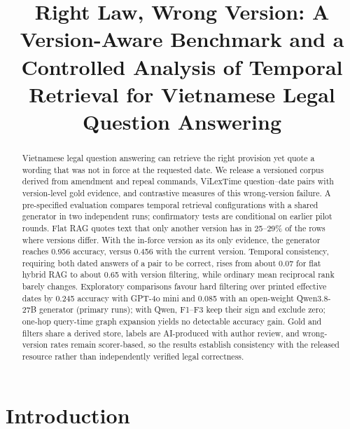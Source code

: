 \documentclass[sigconf,anonymous,review]{acmart}
\begin{document}
\title{Right Law, Wrong Version: A Version-Aware Benchmark and a Controlled Analysis of Temporal Retrieval for Vietnamese Legal Question Answering}



\begin{abstract}
Vietnamese legal question answering can retrieve the right provision yet quote a wording that was not in force at the requested date. We release a versioned corpus derived from amendment and repeal commands, ViLexTime question--date pairs with version-level gold evidence, and contrastive measures of this wrong-version failure. A pre-specified evaluation compares temporal retrieval configurations with a shared generator in two independent runs; confirmatory tests are conditional on earlier pilot rounds. Flat RAG quotes text that only another version has in 25--29\% of the rows where versions differ. With the in-force version as its only evidence, the generator reaches 0.956 accuracy, versus 0.456 with the current version. Temporal consistency, requiring both dated answers of a pair to be correct, rises from about 0.07 for flat hybrid RAG to about 0.65 with version filtering, while ordinary mean reciprocal rank barely changes. Exploratory comparisons favour hard filtering over printed effective dates by 0.245 accuracy with GPT-4o mini and 0.085 with an open-weight Qwen3.8-27B generator (primary runs); with Qwen, F1--F3 keep their sign and exclude zero; one-hop query-time graph expansion yields no detectable accuracy gain. Gold and filters share a derived store, labels are AI-produced with author review, and wrong-version rates remain scorer-based, so the results establish consistency with the released resource rather than independently verified legal correctness.
\end{abstract}


\maketitle

\section{Introduction}
\label{sec:intro}
\end{document}
